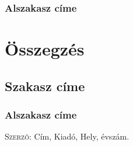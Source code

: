\documentclass[centeredchapter]{thesis-ekf}
\theoremstyle{definition}
\theoremstyle{remark}
\begin{document}
\subsection{Alszakasz címe}

\chapter{Összegzés}

\section{Szakasz címe}

\subsection{Alszakasz címe}


\begin{thebibliography}{1}
 \textsc{Szerző}: Cím, Kiadó, Hely, évszám.
\end{thebibliography}
\end{document}
